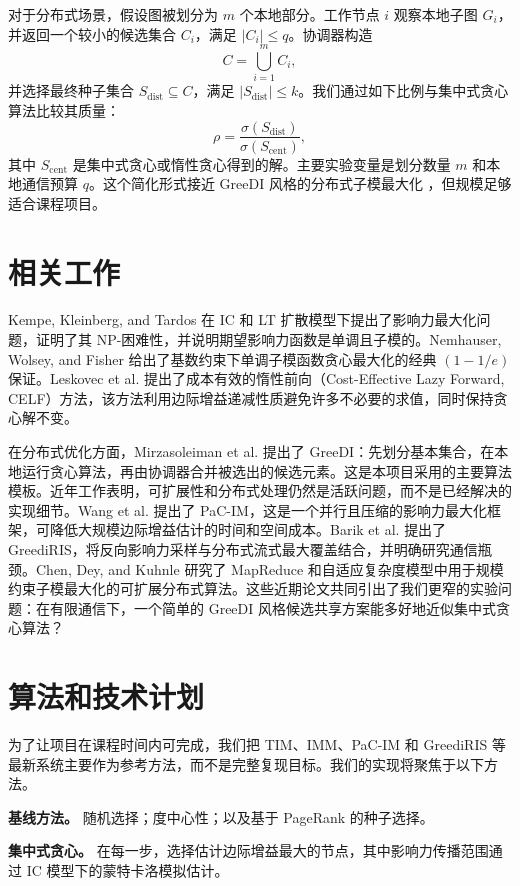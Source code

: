 \documentclass[10pt]{ctexart}
\begin{document}
对于分布式场景，假设图被划分为 $m$ 个本地部分。工作节点 $i$ 观察本地子图 $G_i$，并返回一个较小的候选集合 $C_i$，满足 $|C_i|\le q$。协调器构造
\[
C=\bigcup_{i=1}^{m} C_i,
\]
并选择最终种子集合 $S_{\mathrm{dist}}\subseteq C$，满足 $|S_{\mathrm{dist}}|\le k$。我们通过如下比例与集中式贪心算法比较其质量：
\[
\rho=\frac{\sigma(S_{\mathrm{dist}})}{\sigma(S_{\mathrm{cent}})},
\]
其中 $S_{\mathrm{cent}}$ 是集中式贪心或惰性贪心得到的解。主要实验变量是划分数量 $m$ 和本地通信预算 $q$。这个简化形式接近 GreeDI 风格的分布式子模最大化 \cite{mirzasoleiman2013distributed}，但规模足够适合课程项目。

\section{相关工作}
Kempe, Kleinberg, and Tardos \cite{kempe2003maximizing} 在 IC 和 LT 扩散模型下提出了影响力最大化问题，证明了其 NP-困难性，并说明期望影响力函数是单调且子模的。Nemhauser, Wolsey, and Fisher \cite{nemhauser1978analysis} 给出了基数约束下单调子模函数贪心最大化的经典 $(1-1/e)$ 保证。Leskovec et al. \cite{leskovec2007cost} 提出了成本有效的惰性前向（Cost-Effective Lazy Forward, CELF）方法，该方法利用边际增益递减性质避免许多不必要的求值，同时保持贪心解不变。

在分布式优化方面，Mirzasoleiman et al. \cite{mirzasoleiman2013distributed} 提出了 GreeDI：先划分基本集合，在本地运行贪心算法，再由协调器合并被选出的候选元素。这是本项目采用的主要算法模板。近年工作表明，可扩展性和分布式处理仍然是活跃问题，而不是已经解决的实现细节。Wang et al. \cite{wang2023fast} 提出了 PaC-IM，这是一个并行且压缩的影响力最大化框架，可降低大规模边际增益估计的时间和空间成本。Barik et al. \cite{barik2025greediris} 提出了 GreediRIS，将反向影响力采样与分布式流式最大覆盖结合，并明确研究通信瓶颈。Chen, Dey, and Kuhnle \cite{chen2024scalable} 研究了 MapReduce 和自适应复杂度模型中用于规模约束子模最大化的可扩展分布式算法。这些近期论文共同引出了我们更窄的实验问题：在有限通信下，一个简单的 GreeDI 风格候选共享方案能多好地近似集中式贪心算法？

\section{算法和技术计划}
为了让项目在课程时间内可完成，我们把 TIM、IMM、PaC-IM 和 GreediRIS 等最新系统主要作为参考方法，而不是完整复现目标。我们的实现将聚焦于以下方法。

\textbf{基线方法。} 随机选择；度中心性；以及基于 PageRank 的种子选择。

\textbf{集中式贪心。} 在每一步，选择估计边际增益最大的节点，其中影响力传播范围通过 IC 模型下的蒙特卡洛模拟估计。
\end{document}
